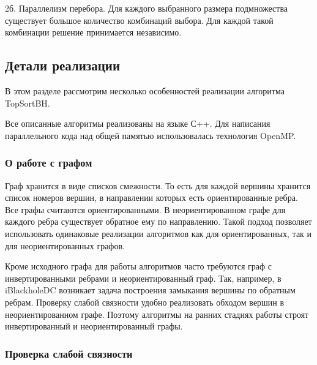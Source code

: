 \documentclass[12pt,a4paper,oneside,openany]{article}
\theoremstyle{definition}
\theoremstyle{lemma}
\theoremstyle{remark}
\begin{document}
2б. Параллелизм перебора. Для каждого выбранного размера подмножества существует большое количество
комбинаций выбора. Для каждой такой комбинации решение принимается независимо.

\subsection{Детали реализации}\label{subsec:implementation}

В этом разделе рассмотрим несколько особенностей реализации алгоритма TopSortBH.

Все описанные алгоритмы реализованы на языке С++. Для написания параллельного кода
над общей памятью использовалась технология OpenMP.

\subsubsection{О работе с графом}\label{subsubsec:graph}

Граф хранится в виде списков смежности. То есть для каждой вершины хранится список номеров вершин,
в направлении которых есть ориентированные ребра. Все графы считаются ориентированными.
В неориентированном графе для каждого ребра существует обратное ему по направлению. Такой подход
позволяет использовать одинаковые реализации алгоритмов как для ориентированных,
так и для неориентированных графов.

Кроме исходного графа для работы алгоритмов часто требуются граф с инвертированными ребрами и неориентированный граф.
Так, например, в iBlackholeDC возникает задача построения замыкания вершины по обратным ребрам.
Проверку слабой связности удобно реализовать обходом вершин в неориентированном графе.
Поэтому алгоритмы на ранних стадиях работы строят инвертированный и неориентированный графы.

%
%

\subsubsection{Проверка слабой связности}\label{subsubsec:connectivitycheck}
\end{document}
